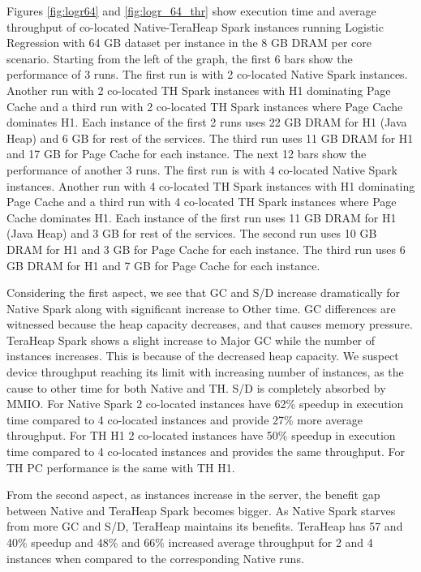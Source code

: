 Figures \ref{fig:logr64} and \ref{fig:logr_64_thr} show execution time and average throughput of co-located
Native-TeraHeap Spark instances running Logistic Regression with 64 GB
dataset per instance in the 8 GB DRAM per core scenario.
Starting from the left of the graph, the first 6 bars show the
performance of 3 runs. The first run is with 2 co-located Native Spark instances.
Another run with 2 co-located TH Spark instances with H1 dominating Page Cache
and a third run with 2 co-located TH Spark instances where Page Cache dominates H1.
Each instance of the first 2 runs uses 22 GB DRAM for H1 (Java Heap) and 6 GB for rest of the services.
The third run uses 11 GB DRAM for H1 and 17 GB for Page Cache for each instance. 
The next 12 bars show the performance of another 3 runs. The first run is with 4 co-located Native Spark instances.
Another run with 4 co-located TH Spark instances with H1 dominating Page Cache
and a third run with 4 co-located TH Spark instances where Page Cache dominates H1.
Each instance of the first run uses 11 GB DRAM for H1 (Java Heap) and 3 GB for rest of the services.
The second run uses 10 GB DRAM for H1 and 3 GB for Page Cache for each instance.
The third run uses 6 GB DRAM for H1 and 7 GB for Page Cache for each instance.

Considering the first aspect, we see that GC and S/D increase dramatically for Native Spark along with significant increase to Other time. GC differences are witnessed because the heap capacity decreases, and that causes memory pressure. TeraHeap Spark shows a slight increase to Major GC while the number of instances increases. This is because of the decreased heap capacity. We suspect device throughput reaching its limit with increasing number of instances, as the cause to other time for both Native and TH. S/D is completely absorbed by MMIO. For Native Spark 2 co-located instances have 62\% speedup in execution time compared to 4 co-located instances and provide 27\% more average throughput. For TH H1 2 co-located instances have 50\% speedup in execution time compared to 4 co-located instances and provides the same throughput. For TH PC performance is the same with TH H1. 

From the second aspect, as instances increase in the server, the benefit gap between Native and TeraHeap Spark becomes bigger. As Native Spark starves from more GC and S/D, TeraHeap maintains its benefits. TeraHeap has 57 and 40\% speedup and 48\% and 66\% increased average throughput for 2 and 4 instances when compared to the corresponding Native runs.

